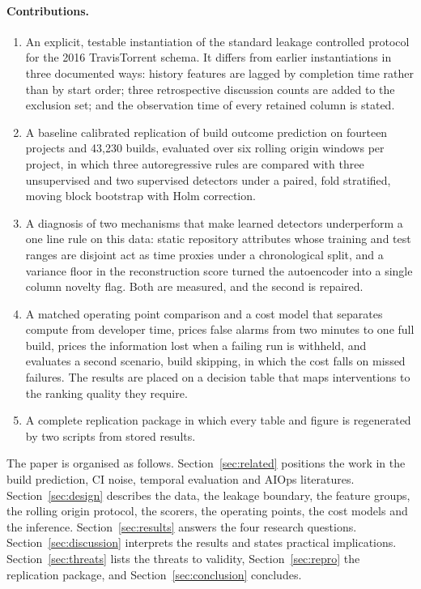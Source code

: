 \documentclass[sigconf,review,anonymous,nonacm]{acmart}
\begin{document}
\paragraph{Contributions.}
\begin{enumerate}
  \item An explicit, testable instantiation of the standard leakage controlled protocol for the 2016 TravisTorrent schema. It differs from earlier instantiations in three documented ways: history features are lagged by completion time rather than by start order; three retrospective discussion counts are added to the exclusion set; and the observation time of every retained column is stated.
  \item A baseline calibrated replication of build outcome prediction on fourteen projects and 43{,}230 builds, evaluated over six rolling origin windows per project, in which three autoregressive rules are compared with three unsupervised and two supervised detectors under a paired, fold stratified, moving block bootstrap with Holm correction.
  \item A diagnosis of two mechanisms that make learned detectors underperform a one line rule on this data: static repository attributes whose training and test ranges are disjoint act as time proxies under a chronological split, and a variance floor in the reconstruction score turned the autoencoder into a single column novelty flag. Both are measured, and the second is repaired.
  \item A matched operating point comparison and a cost model that separates compute from developer time, prices false alarms from two minutes to one full build, prices the information lost when a failing run is withheld, and evaluates a second scenario, build skipping, in which the cost falls on missed failures. The results are placed on a decision table that maps interventions to the ranking quality they require.
  \item A complete replication package in which every table and figure is regenerated by two scripts from stored results.
\end{enumerate}

The paper is organised as follows. Section~\ref{sec:related} positions the work in the build prediction, CI noise, temporal evaluation and AIOps literatures. Section~\ref{sec:design} describes the data, the leakage boundary, the feature groups, the rolling origin protocol, the scorers, the operating points, the cost models and the inference. Section~\ref{sec:results} answers the four research questions. Section~\ref{sec:discussion} interprets the results and states practical implications. Section~\ref{sec:threats} lists the threats to validity, Section~\ref{sec:repro} the replication package, and Section~\ref{sec:conclusion} concludes.
\end{document}
